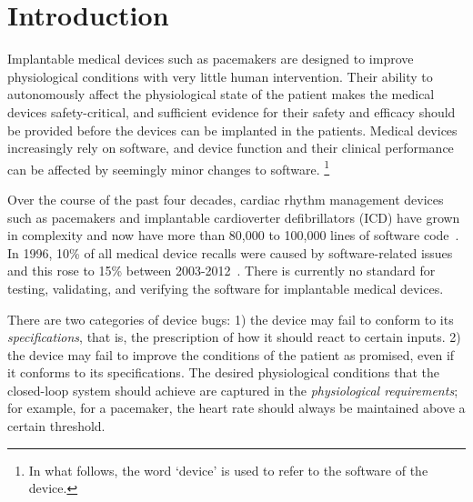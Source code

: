 \section{Introduction}
\label{introduction}

Implantable medical devices such as pacemakers are designed to improve physiological conditions with very little human intervention. 
Their ability to autonomously affect the physiological state of the patient makes the medical devices safety-critical, and sufficient evidence for their safety and efficacy should be provided before the devices can be implanted in the patients. Medical devices increasingly rely on software, and device function and their clinical performance can be affected by seemingly minor changes to software.
\footnote{In what follows, the word `device' is used to refer to the software of the device.}

Over the course of the past four decades, cardiac rhythm management devices such as pacemakers and implantable cardioverter defibrillators (ICD) have grown in complexity and now have more than 80,000 to 100,000 lines of software code~\cite{pauljones}. In 1996, 10\% of all medical device recalls were caused by software-related issues and this rose to 15\% between 2003-2012~\cite{recall_stats,killedbycode}. There is currently no standard for testing, validating, and verifying the software for implantable medical devices.

There are two categories of device bugs: 
1) the device may fail to conform to its \emph{specifications}, that is, the prescription of how it should react to certain inputs.  
2) the device may fail to improve the conditions of the patient as promised, even if it conforms to its specifications. 
The desired physiological conditions that the closed-loop system should achieve are captured in the \emph{physiological requirements}; for example, for a pacemaker, the heart rate should always be maintained above a certain threshold. 

